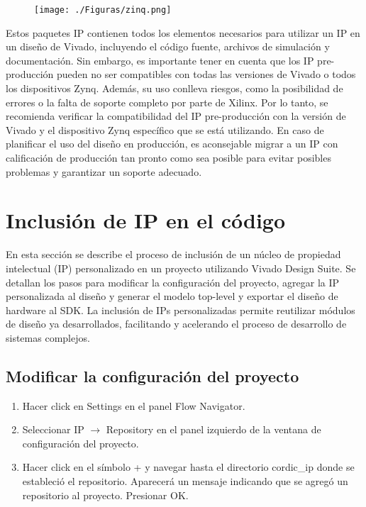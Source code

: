 \documentclass[12pt,a4paper, twoside]{article} %
\begin{document}
\begin{figure}[ht]
\centering
\texttt{[image: ./Figuras/zinq.png]}
\label{fig:Flujo de trabajo creación IP}
\end{figure}

Estos paquetes IP contienen todos los elementos necesarios para utilizar un IP en un diseño de Vivado, incluyendo el código fuente, archivos de simulación y documentación. Sin embargo, es importante tener en cuenta que los IP pre-producción pueden no ser compatibles con todas las versiones de Vivado o todos los dispositivos Zynq. Además, su uso conlleva riesgos, como la posibilidad de errores o la falta de soporte completo por parte de Xilinx. Por lo tanto, se recomienda verificar la compatibilidad del IP pre-producción con la versión de Vivado y el dispositivo Zynq específico que se está utilizando. En caso de planificar el uso del diseño en producción, es aconsejable migrar a un IP con calificación de producción tan pronto como sea posible para evitar posibles problemas y garantizar un soporte adecuado.

\newpage

\section{Inclusión de IP en el código}

En esta sección se describe el proceso de inclusión de un núcleo de propiedad intelectual (IP) personalizado en un proyecto utilizando Vivado Design Suite. Se detallan los pasos para modificar la configuración del proyecto, agregar la IP personalizada al diseño y generar el modelo top-level y exportar el diseño de hardware al SDK. La inclusión de IPs personalizadas permite reutilizar módulos de diseño ya desarrollados, facilitando y acelerando el proceso de desarrollo de sistemas complejos.


\subsection{Modificar la configuración del proyecto}

\begin{enumerate}
    \item Hacer click en Settings en el panel Flow Navigator.
    \item Seleccionar IP $\rightarrow$ Repository en el panel izquierdo de la ventana de configuración del proyecto.
    \item Hacer click en el símbolo + y navegar hasta el directorio cordic\_ip donde se estableció el repositorio. Aparecerá un mensaje indicando que se agregó un repositorio al proyecto. Presionar OK.
\end{enumerate}
\end{document}
